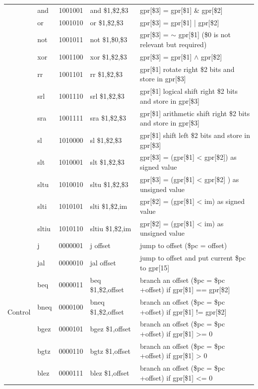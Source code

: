 \documentclass{sig-alternate}
\begin{document}
\begin{table}
\begin{tabular}{|c|l|c|l|l|}
 & and & 1001001 & and \$1,\$2,\$3 & gpr[\$3] = gpr[\$1] \& gpr[\$2] \\ \cline{2-5}  
 & or & 1001010 & or \$1,\$2,\$3 & gpr[\$3] = gpr[\$1] | gpr[\$2] \\ \cline{2-5}
 & not & 1001011 & not \$1,\$0,\$3 & gpr[\$3] = $\sim$ gpr[\$1]  (\$0 is not relevant but required) \\ \cline{2-5}
 & xor & 1001100 & xor \$1,\$2,\$3 & gpr[\$3] = gpr[\$1] $\wedge$ gpr[\$2] \\ \cline{2-5}
 & rr & 1001101 & rr \$1,\$2,\$3 &  gpr[\$1] rotate right \$2 bits and store in gpr[\$3] \\ \cline{2-5}
 & srl & 1001110 & srl \$1,\$2,\$3 & gpr[\$1] logical shift right \$2 bits and store in gpr[\$3]  \\ \cline{2-5}  
 & sra & 1001111 & sra \$1,\$2,\$3 & gpr[\$1] arithmetic shift right \$2 bits and store in gpr[\$3]  \\ \cline{2-5}
 & sl & 1010000 & sl \$1,\$2,\$3 & gpr[\$1] shift left \$2 bits and store in gpr[\$3]  \\ \cline{2-5}
 & slt & 1010001 & slt \$1,\$2,\$3 & gpr[\$3] = (gpr[\$1] < gpr[\$2]) as signed value \\ \cline{2-5}
 & sltu & 1010010 & sltu \$1,\$2,\$3 &  gpr[\$3] = (gpr[\$1] < gpr[\$2] ) as unsigned value \\ \cline{2-5}
 & slti &1010101 & slti \$1,\$2,im & gpr[\$2] = (gpr[\$1] < im) as signed value \\ \cline{2-5}
 & sltiu & 1010110 & sltiu \$1,\$2,im &  gpr[\$2] = (gpr[\$1] < im) as unsigned value\\ \hline
\multirow{9}{*}{Control} & j & 0000001 & j offset & jump to offset (\$pc = offset) \\ \cline{2-5}
 & jal & 0000010 & jal offset & jump to offset and put current \$pc to gpr[15] \\ \cline{2-5}  
 & beq & 0000011 & beq \$1,\$2,offset & branch an offset (\$pc = \$pc +offset) if gpr[\$1] == gpr[\$2] \\ \cline{2-5}
 & bneq & 0000100 & bneq \$1,\$2,offset & branch an offset (\$pc = \$pc +offset) if gpr[\$1] != gpr[\$2] \\ \cline{2-5}
 & bgez & 0000101 & bgez \$1,offset & branch an offset (\$pc = \$pc +offset) if gpr[\$1] >= 0 \\ \cline{2-5}
 & bgtz & 0000110 & bgtz \$1,offset & branch an offset (\$pc = \$pc +offset) if gpr[\$1] > 0 \\ \cline{2-5}
 & blez & 0000111 & blez \$1,offset &  branch an offset (\$pc = \$pc +offset) if gpr[\$1] <= 0 \\ \cline{2-5}  

\end{tabular}
\end{table}
\end{document}
